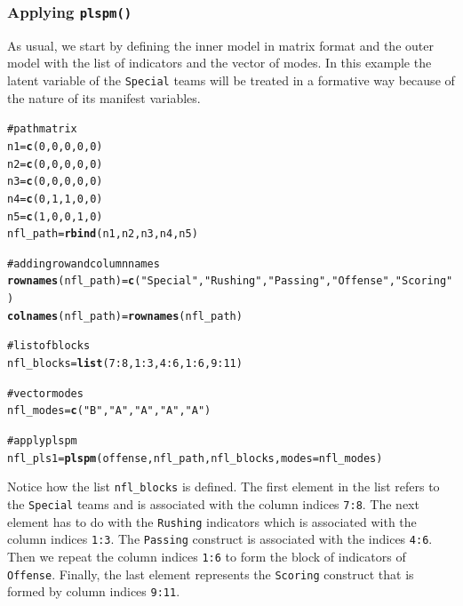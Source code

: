 \documentclass[12pt]{book}\usepackage{graphicx, color}
\makeatletter
\newcommand{\hlfunctioncall}[1]{\textcolor[rgb]{0.501960784313725,0,0.329411764705882}{\textbf{#1}}}%
\newcommand{\hlstring}[1]{\textcolor[rgb]{0.6,0.6,1}{#1}}%
\newcommand{\hlcomment}[1]{\textcolor[rgb]{0.180392156862745,0.6,0.341176470588235}{#1}}%
\newenvironment{kframe}{%
 \def\at@end@of@kframe{}%
 \ifinner\ifhmode%
  \def\at@end@of@kframe{\end{minipage}}%
  \begin{minipage}{\columnwidth}%
 \fi\fi%
 \def\FrameCommand##1{\hskip\@totalleftmargin \hskip-\fboxsep
 \colorbox{shadecolor}{##1}\hskip-\fboxsep
     \hskip-\linewidth \hskip-\@totalleftmargin \hskip\columnwidth}%
 \MakeFramed {\advance\hsize-\width
   \@totalleftmargin\z@ \linewidth\hsize
   \@setminipage}}%
 {\par\unskip\endMakeFramed%
 \at@end@of@kframe}
\newenvironment{knitrout}{}{} %
\newcommand{\fplspm}{\texttt{plspm()}}
\newcommand{\code}[1]{\texttt{#1}}
\makeatother
\begin{document}
\subsubsection{Applying \fplspm{}}
As usual, we start by defining the inner model in matrix format and the outer model with the list of indicators and the vector of modes. In this example the latent variable of the \code{Special} teams will be treated in a formative way because of the nature of its manifest variables.
\begin{knitrout}
\color{fgcolor}\begin{kframe}
\begin{alltt}
\hlcomment{# path matrix}
n1 = \hlfunctioncall{c}(0, 0, 0, 0, 0)
n2 = \hlfunctioncall{c}(0, 0, 0, 0, 0)
n3 = \hlfunctioncall{c}(0, 0, 0, 0, 0)
n4 = \hlfunctioncall{c}(0, 1, 1, 0, 0)
n5 = \hlfunctioncall{c}(1, 0, 0, 1, 0)
nfl_path = \hlfunctioncall{rbind}(n1, n2, n3, n4, n5)

\hlcomment{# adding row and column names}
\hlfunctioncall{rownames}(nfl_path) = \hlfunctioncall{c}(\hlstring{"Special"}, \hlstring{"Rushing"}, \hlstring{"Passing"}, \hlstring{"Offense"}, \hlstring{"Scoring"})
\hlfunctioncall{colnames}(nfl_path) = \hlfunctioncall{rownames}(nfl_path)

\hlcomment{# list of blocks}
nfl_blocks = \hlfunctioncall{list}(7:8, 1:3, 4:6, 1:6, 9:11)

\hlcomment{# vector modes}
nfl_modes = \hlfunctioncall{c}(\hlstring{"B"}, \hlstring{"A"}, \hlstring{"A"}, \hlstring{"A"}, \hlstring{"A"})

\hlcomment{# apply plspm}
nfl_pls1 = \hlfunctioncall{plspm}(offense, nfl_path, nfl_blocks, modes = nfl_modes)
\end{alltt}
\end{kframe}
\end{knitrout}


Notice how the list \code{nfl\_blocks} is defined. The first element in the list refers to the \code{Special} teams and is associated with the column indices \code{7:8}. The next element has to do with the \code{Rushing} indicators which is associated with the column indices \code{1:3}. The \code{Passing} construct is associated with the indices \code{4:6}. Then we repeat the column indices \code{1:6} to form the block of indicators of \code{Offense}. Finally, the last element represents the \code{Scoring} construct that is formed by column indices \code{9:11}.
\end{document}
